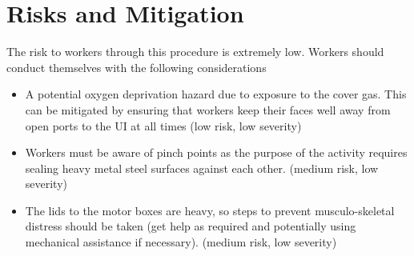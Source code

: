 \documentclass[11pt]{article}
\begin{document}
\section{Risks and Mitigation}

The risk to workers through this procedure is extremely low. Workers should conduct themselves with the following considerations 
\begin{itemize}
\item  A potential oxygen deprivation hazard due to  exposure to the cover gas. This can be mitigated by ensuring that workers keep their faces well away from open ports to the UI at all times (low risk, low severity)
\item Workers must be aware of pinch points as the purpose of the activity requires sealing heavy metal steel surfaces against each other. (medium risk, low severity)
\item The lids to the motor boxes are heavy, so steps to prevent musculo-skeletal distress should be taken (get help as required and potentially using mechanical assistance if necessary). (medium risk, low severity)
\end{itemize}
\end{document}
